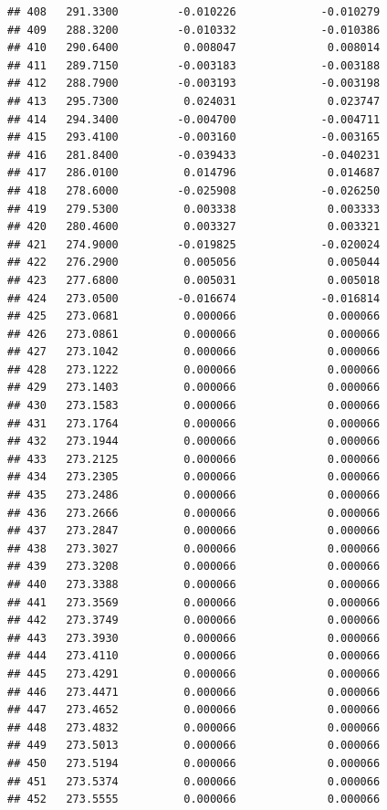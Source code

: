 \documentclass[
]{article}
\begin{document}
\begin{verbatim}
## 408   291.3300         -0.010226             -0.010279
## 409   288.3200         -0.010332             -0.010386
## 410   290.6400          0.008047              0.008014
## 411   289.7150         -0.003183             -0.003188
## 412   288.7900         -0.003193             -0.003198
## 413   295.7300          0.024031              0.023747
## 414   294.3400         -0.004700             -0.004711
## 415   293.4100         -0.003160             -0.003165
## 416   281.8400         -0.039433             -0.040231
## 417   286.0100          0.014796              0.014687
## 418   278.6000         -0.025908             -0.026250
## 419   279.5300          0.003338              0.003333
## 420   280.4600          0.003327              0.003321
## 421   274.9000         -0.019825             -0.020024
## 422   276.2900          0.005056              0.005044
## 423   277.6800          0.005031              0.005018
## 424   273.0500         -0.016674             -0.016814
## 425   273.0681          0.000066              0.000066
## 426   273.0861          0.000066              0.000066
## 427   273.1042          0.000066              0.000066
## 428   273.1222          0.000066              0.000066
## 429   273.1403          0.000066              0.000066
## 430   273.1583          0.000066              0.000066
## 431   273.1764          0.000066              0.000066
## 432   273.1944          0.000066              0.000066
## 433   273.2125          0.000066              0.000066
## 434   273.2305          0.000066              0.000066
## 435   273.2486          0.000066              0.000066
## 436   273.2666          0.000066              0.000066
## 437   273.2847          0.000066              0.000066
## 438   273.3027          0.000066              0.000066
## 439   273.3208          0.000066              0.000066
## 440   273.3388          0.000066              0.000066
## 441   273.3569          0.000066              0.000066
## 442   273.3749          0.000066              0.000066
## 443   273.3930          0.000066              0.000066
## 444   273.4110          0.000066              0.000066
## 445   273.4291          0.000066              0.000066
## 446   273.4471          0.000066              0.000066
## 447   273.4652          0.000066              0.000066
## 448   273.4832          0.000066              0.000066
## 449   273.5013          0.000066              0.000066
## 450   273.5194          0.000066              0.000066
## 451   273.5374          0.000066              0.000066
## 452   273.5555          0.000066              0.000066

\end{verbatim}
\end{document}
